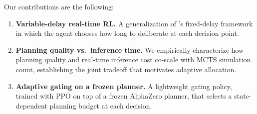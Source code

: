\documentclass{article}
\begin{document}



Our contributions are the following:
\begin{enumerate}[leftmargin=2em]
  \item \textbf{Variable-delay real-time RL.}
    A generalization of \citet{ramstedt2019rtrl}'s fixed-delay
    framework in which the agent chooses how long to deliberate at
    each decision point.
  \item \textbf{Planning quality vs.\ inference time.}
    We empirically characterize how planning quality and real-time
    inference cost co-scale with MCTS simulation count, establishing
    the joint tradeoff that motivates adaptive allocation.
  \item \textbf{Adaptive gating on a frozen planner.}
    A lightweight gating policy, trained with PPO on top of a frozen
    AlphaZero planner, that selects a state-dependent planning
    budget at each decision.
\end{enumerate}
\end{document}
